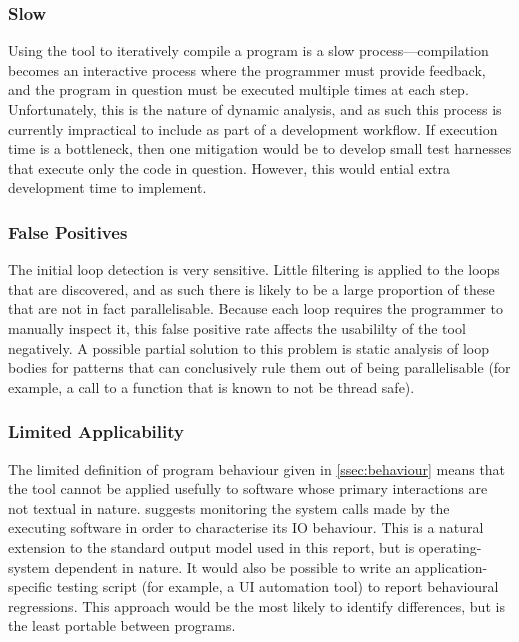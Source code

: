\documentclass[journal]{IEEEtran}
\begin{document}
\subsubsection{Slow} 

Using the tool to iteratively compile a program is a slow process---compilation
becomes an interactive process where the programmer must provide feedback, and
the program in question must be executed multiple times at each step.
Unfortunately, this is the nature of dynamic analysis, and as such this process
is currently impractical to include as part of a development workflow. If
execution time is a bottleneck, then one mitigation would be to develop small
test harnesses that execute only the code in question. However, this would
ential extra development time to implement.

\subsubsection{False Positives}

The initial loop detection is very sensitive. Little filtering is applied to the
loops that are discovered, and as such there is likely to be a large proportion
of these that are not in fact parallelisable. Because each loop requires the
programmer to manually inspect it, this false positive rate affects the
usabililty of the tool negatively. A possible partial solution to this problem
is static analysis of loop bodies for patterns that can conclusively rule them
out of being parallelisable (for example, a call to a function that is known to
not be thread safe).

\subsubsection{Limited Applicability} The limited definition of program
behaviour given in \autoref{ssec:behaviour} means that the tool cannot be
applied usefully to software whose primary interactions are not textual in
nature. \textcite{layton_io_2010} suggests monitoring the system calls made by
the executing software in order to characterise its IO behaviour. This is a
natural extension to the standard output model used in this report, but is
operating-system dependent in nature. It would also be possible to write an
application-specific testing script (for example, a UI automation tool) to
report behavioural regressions. This approach would be the most likely to
identify differences, but is the least portable between programs.
\end{document}
